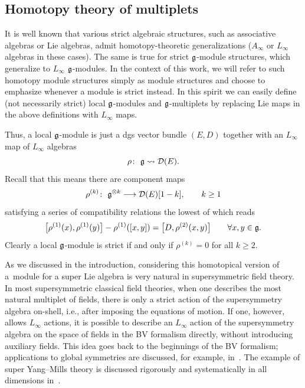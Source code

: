 \documentclass[pdftex]{sigma}
\numberwithin{equation}{section}
\begin{document}
\subsection{Homotopy theory of multiplets}
%
It is well known that various strict algebraic structures, such as associative algebras or Lie algebras, admit homotopy-theoretic generalizations ($A_\infty$ or $L_\infty$ algebras in these cases). The same is true for strict $\mathfrak g$-module structures,
which generalize to $L_\infty$ $\mathfrak g$-modules. In the context of this work, we will refer to such homotopy module structures simply as module structures and choose to emphasize whenever a module is strict instead. In this spirit we can easily define (not necessarily strict) local $\mathfrak g$-modules and $\mathfrak g$-multiplets by replacing Lie maps in the above definitions with $L_\infty$ maps.

Thus, a local $\mathfrak g$-module is just a dgs vector bundle $(E,D)$ together with an $L_\infty$ map of $L_\infty$ algebras
\begin{equation*}
\rho \colon \ \mathfrak g \rightsquigarrow \mathcal D(E) .
\end{equation*}
Recall that this means there are component maps
\begin{equation*}
\rho^{(k)} \colon \ \mathfrak g^{\otimes k} \longrightarrow \mathcal D(E)[1-k], \qquad k \geq 1
\end{equation*}
satisfying a series of compatibility relations the lowest of which reads
\begin{equation*}%
\big[\rho^{(1)}(x),\rho^{(1)}(y)\big] - \rho^{(1)}([x,y]) =\big[D, \rho^{(2)}(x,y)\big] \qquad \forall x,y \in \fg.
\end{equation*}
Clearly a local $\mathfrak g$-module is strict if and only if $\rho^{(k)} = 0$ for all $k\geq2$.

\begin{rmk}
	As we discussed in the introduction, considering this homotopical version of a~module for a super Lie algebra is very natural in supersymmetric field theory. In most supersymmetric classical field theories, when one describes the most natural multiplet of fields, there is only a strict action of the supersymmetry algebra on-shell, i.e., after imposing the equations of motion. If one, however, allows $L_\infty$ actions, it is possible to describe an $L_\infty$ action of the supersymmetry algebra on the space of fields in the BV formalism directly, without introducing auxiliary fields. This idea goes back to the beginnings of the BV formalism; applications to global symmetries are discussed, for example, in~\cite{BaulieuSusy}. The example of super Yang--Mills theory is discussed rigorously and systematically in all dimensions in~\cite{ESW}.
\end{rmk}
\end{document}
